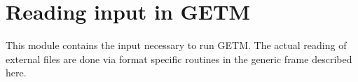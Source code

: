 
\section{Reading input in GETM}

This module contains the input necessary to run GETM. The actual 
reading of external files are done via format specific routines in the
generic frame described here.

